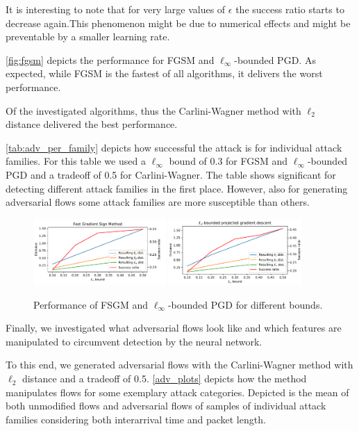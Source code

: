 \documentclass[sigconf,nonacm]{acmart}
\begin{document}
It is interesting to note that for very large values of $\epsilon$ the success ratio starts to decrease again.This phenomenon might be due to numerical effects and might be preventable by a smaller learning rate.


\autoref{fig:fgsm} depicts the performance for FGSM and $\ell_\infty$-bounded PGD. As expected, while FGSM is the fastest of all algorithms, it delivers the worst performance.

Of the investigated algorithms, thus the Carlini-Wagner method with $\ell_2$ distance delivered the best performance.

\autoref{tab:adv_per_family} depicts how successful the attack is for individual attack families. For this table we used a $\ell_\infty$ bound of 0.3 for FGSM and $\ell_\infty$-bounded PGD and a tradeoff of 0.5 for Carlini-Wagner. The table shows significant for detecting different attack families in the first place. However, also for generating adversarial flows some attack families are more susceptible than others.

\begin{figure}
\includegraphics[width=0.45\textwidth]{adv_plots/fgsm.pdf}
\includegraphics[width=0.45\textwidth]{adv_plots/l_inf_pgd.pdf}
\caption{Performance of FSGM and $\ell_\infty$-bounded PGD for different bounds.}
\label{fig:fgsm}
\end{figure}

Finally, we investigated what adversarial flows look like and which features are manipulated to circumvent detection by the neural network.

To this end, we generated adversarial flows with the Carlini-Wagner method with $\ell_2$ distance and a tradeoff of 0.5. \autoref{adv_plots} depicts how the method manipulates flows for some exemplary attack categories. Depicted is the mean of both unmodified flows and adversarial flows  of samples of individual attack families considering both interarrival time and packet length.
\end{document}
